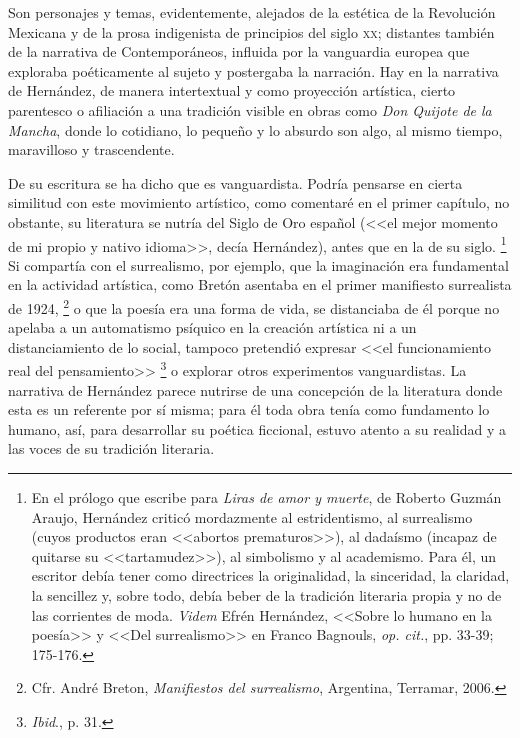 \documentclass[14pt,twoside,final]{extbook} %
\let\oldfootnote\footnote
\renewcommand\footnote[1]{%
\oldfootnote{\hspace{1mm}#1}}
\begin{document}
Son personajes y temas, evidentemente, alejados de la estética de la Revolución Mexicana y de la prosa indigenista de principios del siglo \textsc{xx}; distantes también de la narrativa de Contemporáneos, influida por la vanguardia europea que exploraba poéticamente al sujeto y postergaba la narración. Hay en la narrativa de Hernández, de manera intertextual y como proyección artística, cierto parentesco o afiliación a una tradición visible en obras como \emph{Don Quijote de la Mancha}, donde lo cotidiano, lo pequeño y lo absurdo son algo, al mismo tiempo, maravilloso y trascendente.

De su escritura se ha dicho que es vanguardista. Podría pensarse en cierta similitud con este movimiento artístico, como comentaré en el primer capítulo, no obstante, su literatura se nutría del Siglo de Oro español (<<el mejor momento de mi propio y nativo idioma>>, decía Hernández), antes que en la de su siglo.\footnote{En el prólogo que escribe para \emph{Liras de amor y muerte}, de Roberto Guzmán Araujo, Hernández criticó mordazmente al estridentismo, al surrealismo (cuyos productos eran <<abortos prematuros>>), al dadaísmo (incapaz de quitarse su <<tartamudez>>), al simbolismo y al academismo. Para él, un escritor debía tener como directrices la originalidad, la sinceridad, la claridad, la sencillez y, sobre todo, debía beber de la tradición literaria propia y no de las corrientes de moda. \emph{Videm} Efrén Hernández, <<Sobre lo humano en la poesía>> y <<Del surrealismo>> en Franco Bagnouls, \emph{op. cit.}, pp. 33-39; 175-176.} Si compartía con el surrealismo, por ejemplo, que la imaginación era fundamental en la actividad artística, como Bretón asentaba en el primer manifiesto surrealista de 1924,\footnote{Cfr. André Breton, \emph{Manifiestos del surrealismo}, Argentina, Terramar, 2006.} o que la poesía era una forma de vida, se distanciaba de él porque no apelaba a un automatismo psíquico en la creación artística ni a un distanciamiento de lo social, tampoco pretendió expresar <<el funcionamiento real del pensamiento>>\footnote{\emph{Ibid}., p. 31.} o explorar otros experimentos vanguardistas. La narrativa de Hernández parece nutrirse de una concepción de la literatura donde esta es un referente por sí misma; para él toda obra tenía como fundamento lo humano, así, para desarrollar su poética ficcional, estuvo atento a su realidad y a las voces de su tradición literaria.
\end{document}
